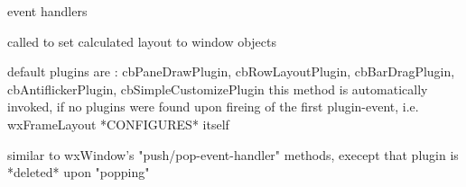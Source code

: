 \label{wxframelayoutonrbuttondown}



\label{wxframelayoutonrbuttonup}



\label{wxframelayoutonsetfocus}



\label{wxframelayoutonsize}


event handlers


\label{wxframelayoutpopallplugins}



\label{wxframelayoutpopplugin}



\label{wxframelayoutpositionclientwindow}


called to set calculated layout to window objects


\label{wxframelayoutpositionpanes}



\label{wxframelayoutpushdefaultplugins}


default plugins are : cbPaneDrawPlugin, cbRowLayoutPlugin, cbBarDragPlugin,
cbAntiflickerPlugin, cbSimpleCustomizePlugin
this method is automatically invoked, if no plugins were found upon
fireing of the first plugin-event, i.e. wxFrameLayout *CONFIGURES* itself


\label{wxframelayoutpushplugin}


similar to wxWindow's "push/pop-event-handler" methods, execept
that plugin is *deleted* upon "popping"


